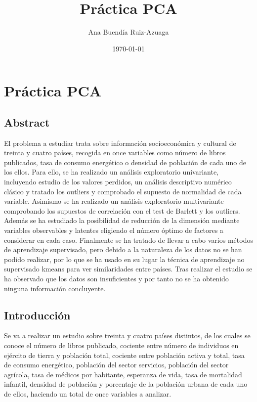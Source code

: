 \documentclass[twoside,openright,titlepage,numbers=noenddot,openany,headinclude,footinclude=true,
cleardoublepage=empty,abstractoff,BCOR=5mm,paper=a4,fontsize=12pt,main=spanish]{scrreprt}
\author{Ana Buendía Ruiz-Azuaga}
\date{\today}
\title{Práctica PCA}
\begin{document}
\maketitle

\tableofcontents
\newpage

\chapter{Práctica PCA}

\section{Abstract}

El problema a estudiar trata sobre información socioeconómica y cultural de treinta y cuatro países, recogida en once variables como número de libros publicados, tasa de consumo energético o densidad de población de cada uno de los ellos. Para ello, se ha realizado un análisis exploratorio univariante, incluyendo estudio de los valores perdidos, un análisis descriptivo numérico clásico y tratado los outliers y comprobado el supuesto de normalidad de cada variable. Asimismo se ha realizado un análisis exploratorio multivariante comprobando los supuestos de correlación con el test de Barlett y los outliers. Además se ha estudiado la posibilidad de reducción de la dimensión mediante variables observables y latentes eligiendo el número óptimo de factores a considerar en cada caso. Finalmente se ha tratado de llevar a cabo varios métodos de aprendizaje supervisado, pero debido a la naturaleza de los datos no se han podido realizar, por lo que se ha usado en su lugar la técnica de aprendizaje no supervisado kmeans para ver similaridades entre países. Tras realizar el estudio se ha observado que los datos son insuficientes y por tanto no se ha obtenido ninguna información concluyente.

\section{Introducción}

Se va a realizar un estudio sobre treinta y cuatro países distintos, de los cuales se conoce el número de libros publicado, cociente entre número de individuos en ejército de tierra y población total, cociente entre población activa y total, tasa de consumo energético, población del sector servicios, población del sector agrícola, tasa de médicos por habitante, esperanza de vida, tasa de mortalidad infantil, densidad de población y porcentaje de la población urbana de cada uno de ellos, haciendo un total de once variables a analizar.
\end{document}
